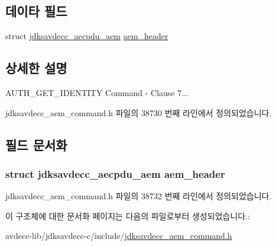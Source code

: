 \subsection*{데이타 필드}
\begin{DoxyCompactItemize}
\item 
struct \hyperlink{structjdksavdecc__aecpdu__aem}{jdksavdecc\+\_\+aecpdu\+\_\+aem} \hyperlink{structjdksavdecc__aem__command__auth__get__identity_ae1e77ccb75ff5021ad923221eab38294}{aem\+\_\+header}
\end{DoxyCompactItemize}


\subsection{상세한 설명}
A\+U\+T\+H\+\_\+\+G\+E\+T\+\_\+\+I\+D\+E\+N\+T\+I\+TY Command -\/ Clause 7... 

jdksavdecc\+\_\+aem\+\_\+command.\+h 파일의 38730 번째 라인에서 정의되었습니다.



\subsection{필드 문서화}
\subsubsection[{\texorpdfstring{aem\+\_\+header}{aem_header}}]{\setlength{\rightskip}{0pt plus 5cm}struct {\bf jdksavdecc\+\_\+aecpdu\+\_\+aem} aem\+\_\+header}\hypertarget{structjdksavdecc__aem__command__auth__get__identity_ae1e77ccb75ff5021ad923221eab38294}{}\label{structjdksavdecc__aem__command__auth__get__identity_ae1e77ccb75ff5021ad923221eab38294}


jdksavdecc\+\_\+aem\+\_\+command.\+h 파일의 38732 번째 라인에서 정의되었습니다.



이 구조체에 대한 문서화 페이지는 다음의 파일로부터 생성되었습니다.\+:\begin{DoxyCompactItemize}
\item 
avdecc-\/lib/jdksavdecc-\/c/include/\hyperlink{jdksavdecc__aem__command_8h}{jdksavdecc\+\_\+aem\+\_\+command.\+h}\end{DoxyCompactItemize}
